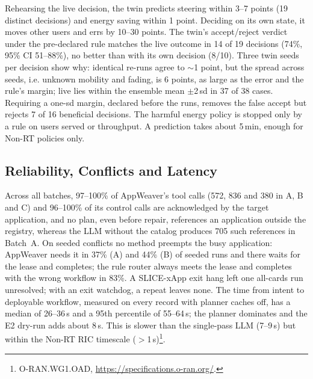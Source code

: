 \documentclass[conference]{IEEEtran}
\begin{document}
Rehearsing the live decision, the twin predicts steering within 3--7 points (19 distinct decisions) and energy saving within 1 point. Deciding on its own state, it moves other users and errs by 10--30 points. The twin's accept/reject verdict under the pre-declared rule matches the live outcome in 14 of 19 decisions (74\%, 95\% CI 51--88\%), no better than with its own decision (8/10). Three twin seeds per decision show why: identical re-runs agree to $\sim$1 point, but the spread across seeds, i.e. unknown mobility and fading, is 6 points, as large as the error and the rule's margin; live lies within the ensemble mean $\pm$2\,sd in 37 of 38 cases. Requiring a one-sd margin, declared before the runs, removes the false accept but rejects 7 of 16 beneficial decisions. The harmful energy policy is stopped only by a rule on users served or throughput. A prediction takes about 5\,min, enough for Non-RT policies only.

\subsection{Reliability, Conflicts and Latency}
Across all batches, 97--100\% of AppWeaver's tool calls (572, 836 and 380 in A, B and C) and 96--100\% of its control calls are acknowledged by the target application, and no plan, even before repair, references an application outside the registry, whereas the LLM without the catalog produces 705 such references in Batch~A. On seeded conflicts no method preempts the busy application: AppWeaver needs it in 37\% (A) and 44\% (B) of seeded runs and there waits for the lease and completes; the rule router always meets the lease and completes with the wrong workflow in 83\%. A SLICE-xApp exit hang left one all-cards run unresolved; with an exit watchdog, a repeat leaves none. The time from intent to deployable workflow, measured on every record with planner caches off, has a median of 26--36\,s and a 95th percentile of 55--64\,s; the planner dominates and the E2 dry-run adds about 8\,s. This is slower than the single-pass LLM (7--9\,s) but within the Non-RT RIC timescale ($>$1\,s)\footnote{O-RAN.WG1.OAD, \url{https://specifications.o-ran.org/}.}.
\end{document}
